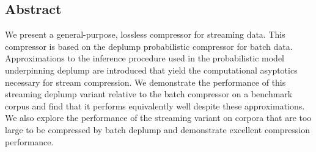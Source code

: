 \subsection*{Abstract}

We present a general-purpose, lossless compressor for  streaming data.  This compressor is based on the deplump probabilistic compressor for batch data.  Approximations to the inference procedure used in the probabilistic model underpinning deplump are introduced that yield the computational asyptotics necessary for stream compression. We demonstrate the performance of this streaming deplump variant relative to the batch compressor on a benchmark corpus and find that it performs equivalently well despite these approximations.  We also explore the performance of the streaming variant on corpora that are too large to be compressed by batch deplump and demonstrate excellent compression performance.

